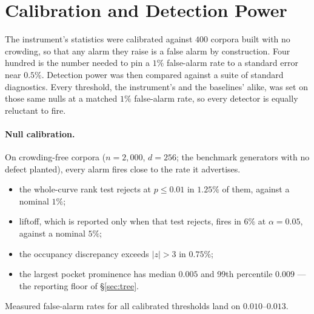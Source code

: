\documentclass[11pt,letterpaper]{article}
\begin{document}
\section{Calibration and Detection Power}
\label{sec:power}

The instrument's statistics were calibrated against $400$ corpora built
with no crowding, so that any alarm they raise is a false alarm by
construction. Four hundred is the number needed to pin a $1\%$ false-alarm
rate to a standard error near $0.5\%$. Detection power was then compared
against a suite of standard diagnostics. Every threshold, the instrument's
and the baselines' alike, was set on those same nulls at a matched $1\%$
false-alarm rate, so every detector is equally reluctant to fire.

\paragraph{Null calibration.}
On crowding-free corpora ($n = 2{,}000$, $d = 256$; the benchmark
generators with no defect planted), every alarm fires close to the rate
it advertises.
\begin{itemize}
\item the whole-curve rank test rejects at $p \le 0.01$ in $1.25\%$ of
  them, against a nominal $1\%$;
\item liftoff, which is reported only when that test rejects, fires in
  $6\%$ at $\alpha = 0.05$, against a nominal $5\%$;
\item the occupancy discrepancy exceeds $|z| > 3$ in $0.75\%$;
\item the largest pocket prominence has median $0.005$ and 99th
  percentile $0.009$ --- the reporting floor of \S\ref{sec:tree}.
\end{itemize}
Measured false-alarm rates for all calibrated thresholds land on
$0.010$--$0.013$.
\end{document}
